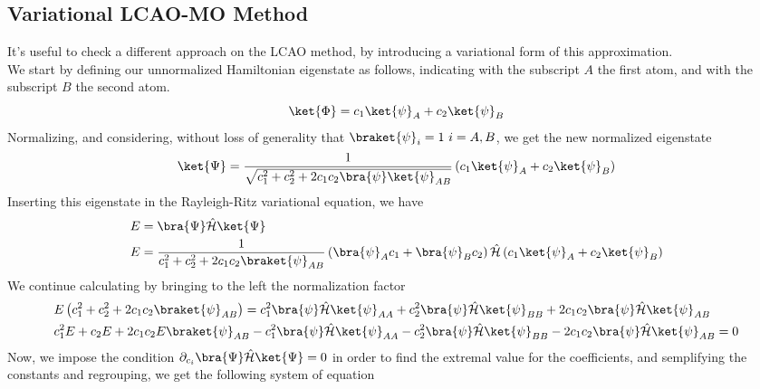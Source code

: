 \documentclass[a4paper, 11pt]{book}
\newcommand{\1}{\opr{\mathds{1}}}
\newcommand{\ham}{\mathcal{H}}
\newcommand{\opr}[1]{\hat{#1}}
\theoremstyle{plain}
\begin{document}
	\subsection{Variational LCAO-MO Method}
	It's useful to check a different approach on the LCAO method, by introducing a variational form of this approximation.\\
	We start by defining our unnormalized Hamiltonian eigenstate as follows, indicating with the subscript $A$ the first atom, and with the subscript $B$ the second atom.\\
	\begin{equation}
		\ket{\Phi}=c_1\ket{\psi}_A+c_2\ket{\psi}_B
		\label{eq:unnormalizedvarLCAO}
	\end{equation}
	Normalizing, and considering, without loss of generality that $\braket{\psi}_i=1\ i=A,B$, we get the new normalized eigenstate
	\begin{equation}
		\ket{\Psi}=\frac{1}{\sqrt{c_1^2+c_2^2+2c_1c_2\bra{\psi}\ket{\psi}_{AB}}}\left( c_1\ket{\psi}_A+c_2\ket{\psi}_B \right)
		\label{eq:normalizedeigenstate}
	\end{equation}
	Inserting this eigenstate in the Rayleigh-Ritz variational equation, we have
	\begin{equation*}
		\begin{aligned}
			E&=\bra{\Psi}\opr{\ham}\ket{\Psi}\\
			E&=\frac{1}{c_1^2+c_2^2+2c_1c_2\braket{\psi}_{AB}}\left( \bra{\psi}_Ac_1+\bra{\psi}_Bc_2 \right)\opr{\ham}\left( c_1\ket{\psi}_A+c_2\ket{\psi}_B \right)
		\end{aligned}
	\end{equation*}
	We continue calculating by bringing to the left the normalization factor
	\begin{equation*}
		\begin{aligned}
			&E\left( c_1^2+c_2^2+2c_1c_2\braket{\psi}_{AB} \right)=c_1^2\bra{\psi}\opr{\ham}\ket{\psi}_{AA}+c_2^2\bra{\psi}\opr{\ham}\ket{\psi}_{BB}+2c_1c_2\bra{\psi}\opr{\ham}\ket{\psi}_{AB}\\
			&c_1^2E+c_2E+2c_1c_2E\braket{\psi}_{AB}-c_1^2\bra{\psi}\opr{\ham}\ket{\psi}_{AA}-c_2^2\bra{\psi}\opr{\ham}\ket{\psi}_{BB}-2c_1c_2\bra{\psi}\opr{\ham}\ket{\psi}_{AB}=0
	\end{aligned}
	\end{equation*}
	Now, we impose the condition $\partial_{c_i}\bra{\Psi}\opr{\ham}\ket{\Psi}=0$ in order to find the extremal value for the coefficients, and semplifying the constants and regrouping, we get the following system of equation
\end{document}
